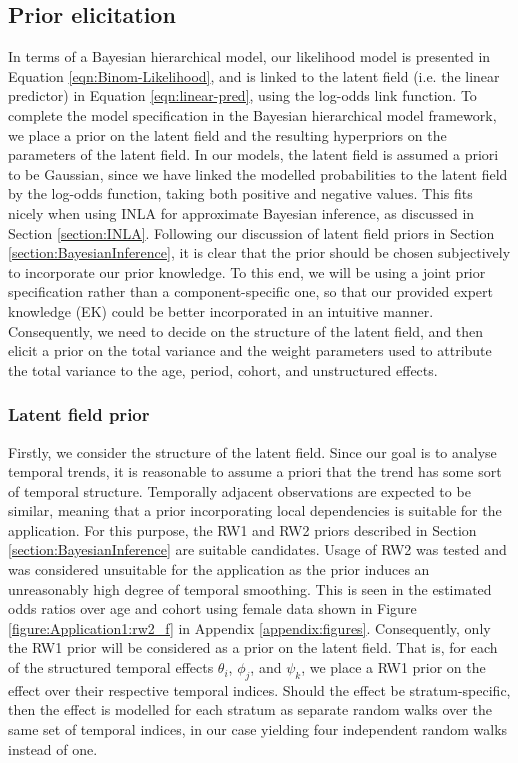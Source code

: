 \FloatBarrier
\subsection{Prior elicitation}\label{section:application1:prior}
In terms of a Bayesian hierarchical model, our likelihood model is presented in Equation \eqref{eqn:Binom-Likelihood}, and is linked to the latent field (i.e. the linear predictor) in Equation \eqref{eqn:linear-pred}, using the log-odds link function. To complete the model specification in the Bayesian hierarchical model framework, we place a prior on the latent field and the resulting hyperpriors on the parameters of the latent field. In our models, the latent field is assumed a priori to be Gaussian, since we have linked the modelled probabilities to the latent field by the log-odds function, taking both positive and negative values. This fits nicely when using INLA for approximate Bayesian inference, as discussed in Section \ref{section:INLA}. Following our discussion of latent field priors in Section \ref{section:BayesianInference}, it is clear that the prior should be chosen subjectively to incorporate our prior knowledge. To this end, we will be using a joint prior specification rather than a component-specific one, so that our provided expert knowledge (EK) could be better incorporated in an intuitive manner. Consequently, we need to decide on the structure of the latent field, and then elicit a prior on the total variance and the weight parameters used to attribute the total variance to the age, period, cohort, and unstructured effects.

\subsubsection{Latent field prior}
\label{section:application1:prior-latent}
Firstly, we consider the structure of the latent field. Since our goal is to analyse temporal trends, it is reasonable to assume a priori that the trend has some sort of temporal structure. Temporally adjacent observations are expected to be similar, meaning that a prior incorporating local dependencies is suitable for the application. For this purpose, the RW1 and RW2 priors described in Section \ref{section:BayesianInference} are suitable candidates. Usage of RW2 was tested and was considered unsuitable for the application as the prior induces an unreasonably high degree of temporal smoothing. This is seen in the estimated odds ratios over age and cohort using female data shown in Figure \ref{figure:Application1:rw2_f} in Appendix \ref{appendix:figures}. Consequently, only the RW1 prior will be considered as a prior on the latent field. That is, for each of the structured temporal effects $\theta_i$, $\phi_j$, and $\psi_k$, we place a RW1 prior on the effect over their respective temporal indices. Should the effect be stratum-specific, then the effect is modelled for each stratum as separate random walks over the same set of temporal indices, in our case yielding four independent random walks instead of one. 

